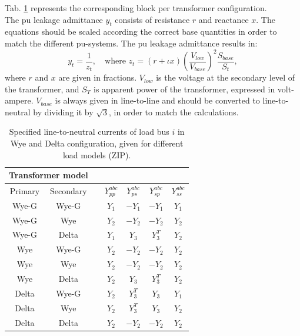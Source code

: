 \documentclass[10pt,journal]{article}
\begin{document}
Tab. \ref{tab:trafoblocks} represents the corresponding block per transformer configuration. \\
The pu leakage admittance $y_t$ consists of resistance $r$ and reactance $x$.  The equations should be scaled according the correct base quantities in order to match the different pu-systems. The pu leakage admittance results in: 
\begin{equation}
    y_t = \frac{1}{z_t},\quad\mbox{where } z_t = (r+\iota x)(\frac{V_{low}}{V_{base}})^2\frac{S_{base}}{S_t},
\end{equation}
where $r$ and $x$ are given in fractions. $V_{low}$ is the voltage at the secondary level of the transformer, and $S_T$ is apparent power of the transformer, expressed in volt-ampere. $V_{base}$ is always given in line-to-line and should be converted to line-to-neutral by dividing it by $\sqrt{3}$, in order to match the calculations. 

 \begin{table}[h]
\renewcommand{\arraystretch}{1.1}
\centering
\caption{Specified line-to-neutral currents of load bus $i$ in Wye and Delta configuration, given for different load models (ZIP). }\label{tab:trafoblocks}
\small
\begin{tabular}{ccccccc}
\toprule
\multicolumn{2}{c}{\textbf{Transformer model}} && \multicolumn{4}{c}{}  \\ 
\midrule
Primary & Secondary && $Y_{pp}^{abc}$ & $Y_{ps}^{abc}$ & $Y_{sp}^{abc}$ & $Y_{ss}^{abc}$  \\
\midrule 
Wye-G & Wye-G && $Y_1$ & $-Y_1$ & $-Y_1$ & $Y_1$\\
Wye-G & Wye   && $Y_2$ & $-Y_2$ & $-Y_2$ & $Y_2$\\
Wye-G & Delta && $Y_1$ & $Y_3$ & $Y_3^T$ & $Y_2$\\
Wye & Wye-G   && $Y_2$ & $-Y_2$ & $-Y_2$ & $Y_2$\\
Wye & Wye     && $Y_2$ & $-Y_2$ & $-Y_2$ & $Y_2$\\
Wye & Delta   && $Y_2$ & $Y_3$ & $Y_3^T$ & $Y_2$\\
Delta & Wye-G && $Y_2$ & $Y_3^T$ & $Y_3$ & $Y_1$\\
Delta & Wye   && $Y_2$ & $Y_3^T$ & $Y_3$ & $Y_2$\\
Delta & Delta && $Y_2$ & $-Y_2$ & $-Y_2$ & $Y_2$\\
\bottomrule
\end{tabular}
\end{table}
\end{document}
